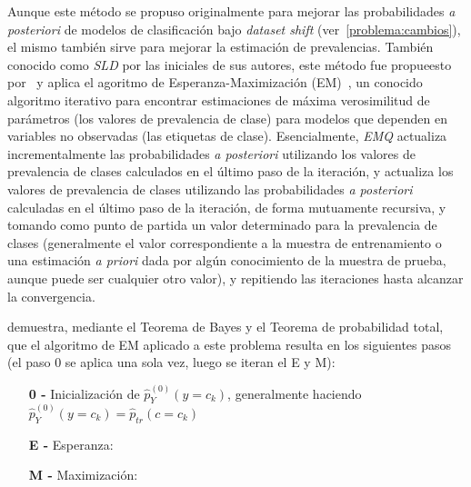 Aunque este método se propuso originalmente para mejorar las probabilidades {\it
a posteriori\/} de modelos de clasificación bajo {\it dataset shift\/}
(ver~\ref{problema:cambios}), el mismo también sirve para mejorar la estimación
de prevalencias. También conocido como {\it SLD\/} por las iniciales de sus
autores, este método fue propueesto por~\citet{saerens2002adjusting} y aplica el
agoritmo de Esperanza-Maximización (EM)~\cite{dempster1977maximum}, un conocido
algoritmo iterativo para encontrar estimaciones de máxima verosimilitud de
parámetros (los valores de prevalencia de clase) para modelos que dependen en
variables no observadas (las etiquetas de clase). Esencialmente, {\it EMQ\/}
actualiza incrementalmente las probabilidades {\it a posteriori\/} utilizando
los valores de prevalencia de clases calculados en el último paso de la
iteración, y actualiza los valores de prevalencia de clases utilizando las
probabilidades {\it a posteriori\/} calculadas en el último paso de la
iteración, de forma mutuamente recursiva, y tomando como punto de partida un
valor determinado para la prevalencia de clases (generalmente el valor
correspondiente a la muestra de entrenamiento o una estimación {\it a priori\/}
dada por algún conocimiento de la muestra de prueba, aunque puede ser cualquier
otro valor), y repitiendo las iteraciones hasta alcanzar la convergencia.

\citet[Apéndice, p.23 a p.25]{saerens2002adjusting} demuestra, mediante el
Teorema de Bayes y el Teorema de probabilidad total, que el algoritmo de EM
aplicado a este problema resulta en los siguientes pasos (el paso 0 se aplica
una sola vez, luego se iteran el E y M):

\begin{enumerate}[leftmargin=*, labelindent=16pt]

    \item[\bf{0 -}] Inicialización de $\hat p^{(0)}_{Y}(y=c_k)$, generalmente
    haciendo $\hat p^{(0)}_{Y}(y=c_k) = \hat p_{tr}(c=c_k)$

    \item[\bf{E -}] Esperanza: \hspace*{\fill}

    \item[\bf{M -}] Maximización: \hspace*{\fill}

\end{enumerate}

